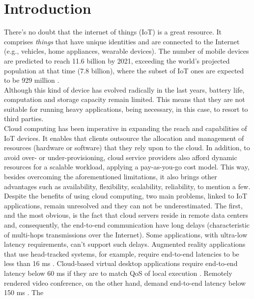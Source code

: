\section{Introduction}\label{sec:Introduction}
\noindent
There’s no doubt that the internet of things (IoT) is a great resource. It
comprises \textit{things} that have unique identities and are connected to the
Internet (e.g., vehicles, home appliances, wearable devices). The number of
mobile devices are predicted to reach 11.6 billion by 2021, exceeding the
world’s projected population at that time (7.8 billion), where the subset of IoT
ones are expected to be 929 million \cite{cisco_2017}.\\
\noindent\tab Although this kind of device has evolved radically in the last
years, battery life, computation and storage capacity remain limited. This means
that they are not suitable for running heavy applications, being necessary, in
this case, to resort to third parties.\\
\noindent\tab Cloud computing has been imperative in expanding the reach and
capabilities of IoT devices. It enables that clients outsource the allocation
and management of resources (hardware or software) that they rely upon to the
cloud. In addition, to avoid over- or under-provisioning, cloud service
providers also afford dynamic resources for a scalable workload, applying a
pay-as-you-go cost model. This way, besides overcoming the aforementioned
limitations, it also brings other advantages such as availability, flexibility,
scalability, reliability, to mention a few.\\
\noindent\tab Despite the benefits of using cloud computing, two main problems,
linked to IoT applications, remain unresolved and they can not be
underestimated. The first, and the most obvious, is the fact that cloud servers
reside in remote data centers and, consequently, the end-to-end communication
have long delays (characteristic of multi-hops transmissions over the Internet).
Some applications, with ultra-low latency requirements, can't support such
delays.  Augmented reality applications that use head-tracked systems, for
example, require end-to-end latencies to be less than 16 ms
\cite{ellis2004generalizeability}. Cloud-based virtual desktop applications
require end-to-end latency below 60 ms if they are to match QoS of local
execution \cite{taylor2015virtual}. Remotely rendered video conference, on the
other hand, demand end-to-end latency below 150 ms \cite{szigeti2005end}. The
